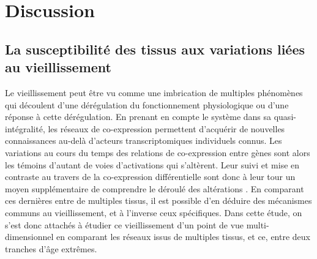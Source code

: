 \section{Discussion}

\subsection{La susceptibilité des tissus aux variations liées au vieillissement}

Le vieillissement peut être vu comme une imbrication de multiples phénomènes qui découlent d'une dérégulation du fonctionnement physiologique ou d'une réponse à cette dérégulation. En prenant en compte le système dans sa quasi-intégralité, les réseaux de co-expression permettent d'acquérir de nouvelles connaissances au-delà d'acteurs transcriptomiques individuels connus. Les variations au cours du temps des relations de co-expression entre gènes sont alors les témoins d'autant de voies d'activations qui s'altèrent. Leur suivi et mise en contraste au travers de la co-expression différentielle sont donc à leur tour un moyen supplémentaire de comprendre le déroulé des altérations . En comparant ces dernières entre de multiples tissus, il est possible d'en déduire des mécanismes communs au vieillissement, et à l'inverse ceux spécifiques. Dans cette étude, on s'est donc attachés à étudier ce vieillissement d'un point de vue multi-dimensionnel en comparant les réseaux issus de multiples tissus, et ce, entre deux tranches d'âge extrêmes. 

